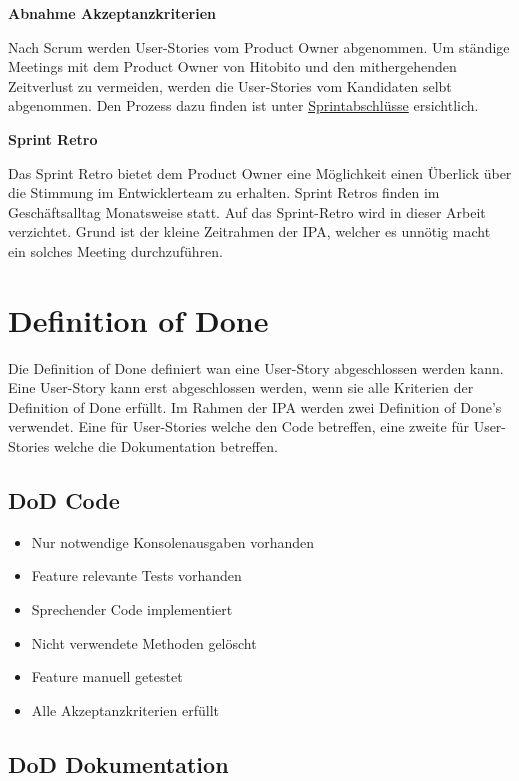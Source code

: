 \textbf{Abnahme Akzeptanzkriterien}

Nach Scrum werden User-Stories vom Product Owner abgenommen. Um ständige Meetings mit dem Product Owner von
Hitobito und den mithergehenden Zeitverlust zu vermeiden, werden die User-Stories vom Kandidaten selbt abgenommen. Den Prozess dazu
finden ist unter \hyperref[sec:sprintfinish]{Sprintabschlüsse} ersichtlich.

\newpage

\textbf{Sprint Retro}

Das Sprint Retro bietet dem Product Owner eine Möglichkeit einen Überlick über die Stimmung im Entwicklerteam zu erhalten. Sprint Retros finden 
im Geschäftsalltag Monatsweise statt. Auf das Sprint-Retro wird
in dieser Arbeit verzichtet. Grund ist der kleine Zeitrahmen der IPA, welcher es unnötig macht ein solches Meeting durchzuführen.

\section{Definition of Done}
\label{dod}
Die Definition of Done definiert wan eine User-Story abgeschlossen werden kann. Eine User-Story kann erst
abgeschlossen werden, wenn sie alle Kriterien der Definition of Done erfüllt. Im Rahmen der IPA werden zwei Definition of Done's verwendet.
Eine für User-Stories welche den Code betreffen, eine zweite für User-Stories welche die Dokumentation betreffen.

\subsection{DoD Code}

\begin{itemize}
    \item Nur notwendige Konsolenausgaben vorhanden
    \item Feature relevante Tests vorhanden
    \item Sprechender Code implementiert
    \item Nicht verwendete Methoden gelöscht
    \item Feature manuell getestet
    \item Alle Akzeptanzkriterien erfüllt
\end{itemize}

\subsection{DoD Dokumentation}

